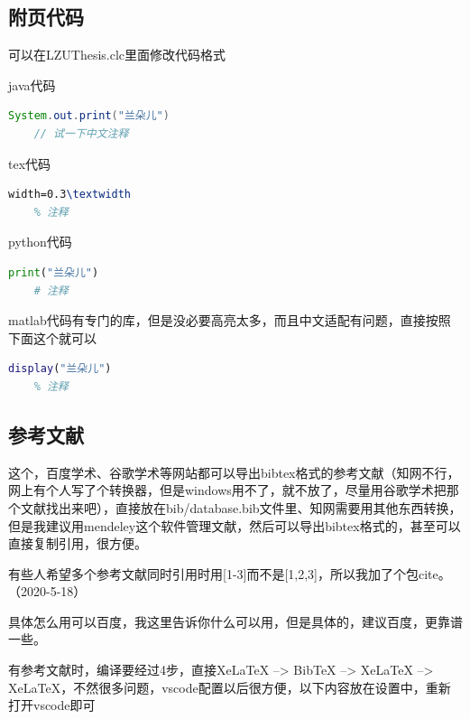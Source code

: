 \documentclass[AutoFakeBold]{template/LZUThesis2021_master}
\begin{document}
\subsection{附页代码} %
\label{sub:附页代码}
可以在LZUThesis.clc里面修改代码格式

java代码
\begin{lstlisting}[language = java]
    System.out.print("兰朵儿")
    // 试一下中文注释
\end{lstlisting}


tex代码
\begin{lstlisting}[language = tex]
    width=0.3\textwidth
    % 注释
\end{lstlisting}

python代码
\begin{lstlisting}[language = python]
    print("兰朵儿")
    # 注释
\end{lstlisting}

matlab代码有专门的库，但是没必要高亮太多，而且中文适配有问题，直接按照下面这个就可以
\begin{lstlisting}[language = matlab]
    display("兰朵儿")
    % 注释
\end{lstlisting}


\subsection{参考文献} %
\label{sub:参考文献}

这个，百度学术、谷歌学术等网站都可以导出bibtex格式的参考文献（知网不行，网上有个人写了个转换器，但是windows用不了，就不放了，尽量用谷歌学术把那个文献找出来吧），直接放在bib/database.bib文件里、知网需要用其他东西转换，但是我建议用mendeley这个软件管理文献，然后可以导出bibtex格式的，甚至可以直接复制引用，很方便\cite{partl2016, tenne1992polyhedral, tussyadiah2015hotels}。

有些人希望多个参考文献同时引用时用[1-3]而不是[1,2,3]，所以我加了个包cite。（2020-5-18）

具体怎么用可以百度，我这里告诉你什么可以用，但是具体的，建议百度，更靠谱一些。


有参考文献时，编译要经过4步，直接XeLaTeX --> BibTeX --> XeLaTeX --> XeLaTeX，不然很多问题，vscode配置以后很方便，以下内容放在设置中，重新打开vscode即可




\end{document}
